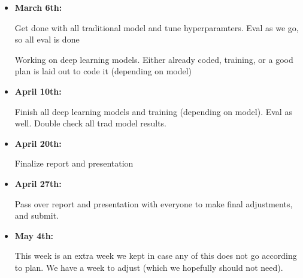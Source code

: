 \documentclass[11pt]{article}
\begin{document}
\begin{itemize}
	\item \textbf{March 6th:}

Get done with all traditional model and tune hyperparamters. Eval as we go, so all eval is done

Working on deep learning models. Either already coded, training, or a good plan is laid out to code it (depending on model)

	\item \textbf{April 10th:}

Finish all deep learning models and training (depending on model). Eval as well. Double check all trad model results.

\item \textbf{April 20th:}

Finalize report and presentation 

\item \textbf{April 27th:}

Pass over report and presentation with everyone to make final adjustments, and submit. 

\item \textbf{May 4th:}

This week is an extra week we kept in case any of this does not go according to plan. We have a week to adjust (which we hopefully should not need).

\end{itemize}
\end{document}
